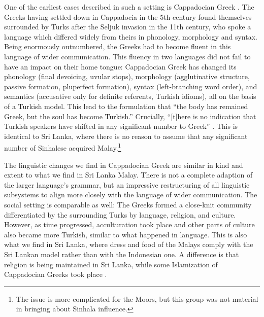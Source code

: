 \documentclass[a4paper,10pt]{article}
\begin{document}
One of the earliest cases described in such a setting is Cappadocian Greek \citep{Dawkins1916}. The Greeks having settled down in Cappadocia in the 5th century found themselves surrounded by Turks after the Seljuk invasion in the 11th century, who spoke a language which differed widely from theirs in phonology, morphology and syntax. Being enormously outnumbered, the Greeks had to become fluent in this language of wider communication. This fluency in two languages did not fail to have an impact on their home tongue: Cappadocian Greek has changed its phonology (final devoicing, uvular stops), morphology (agglutinative structure, passive formation, pluperfect formation), syntax (left-branching word order), and semantics (accusative only for definite referents, Turkish idioms), all on the basis of a Turkish model. This lead \citet[198]{Dawkins1916} to the formulation that ``the body has remained Greek, but the soul has become Turkish.'' Crucially, ``[t]here is no indication that Turkish speakers have shifted in any significant number to Greek'' \citep[251f]{ThomasonEtAl1988}. This is identical to Sri Lanka, where there is no reason to assume that any significant number of Sinhalese acquired Malay.\footnote{The
  issue is more complicated for the Moors, but this group was not material in bringing about Sinhala influence.
}
 


The linguistic changes we find in Cappadocian Greek are similar in kind and extent to what we find in Sri Lanka Malay. There is not a complete adaption of the larger language's grammar, but an impressive restructuring of all linguistic subsystems to align more closely with the language of wider communication. The social setting is comparable as well: The Greeks formed a close-knit community differentiated by the surrounding Turks by language, religion, and culture. However, as time progressed, acculturation took place and other parts of culture also became more Turkish, similar to what happened in language. This is also what we find in Sri Lanka, where dress and food of the Malays comply with the Sri Lankan model rather than with the Indonesian one. A difference is that religion is being maintained in Sri Lanka, while some Islamization of Cappadocian Greeks took place \citep[215]{ThomasonEtAl1988}.
\end{document}

